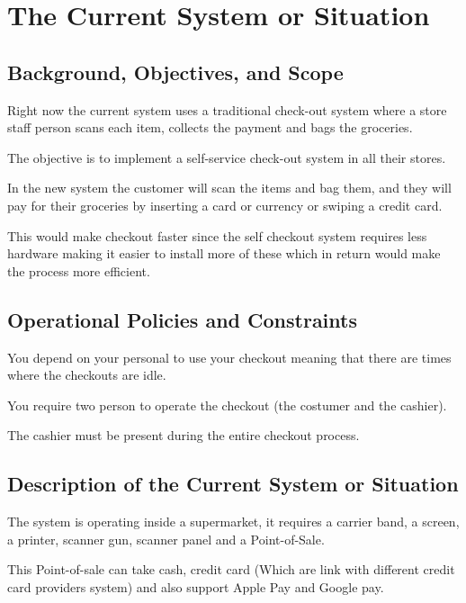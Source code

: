 \section{The Current System or Situation}

\subsection{Background, Objectives, and Scope}

Right now the current system uses a traditional check-out system where a store 
staff person scans each item, collects the payment 
and bags the groceries. \newline

The objective is to implement a self-service check-out system in all 
their stores.\newline

In the new system the customer will scan the items and bag them, and they will 
pay for their groceries by inserting a card or currency 
or swiping a credit card. \newline

This would make checkout faster since the self checkout system requires less 
hardware making it easier to install more of these which in return would make 
the process more efficient.

\subsection{Operational Policies and Constraints}
You depend on your personal to use your checkout meaning that there are 
times where the checkouts are idle. \newline

You require two person to operate the checkout (the costumer 
and the cashier). \newline

The cashier must be present during the entire checkout process.

\pagebreak

\subsection{Description of the Current System or Situation}
The system is operating inside a supermarket, it requires a carrier band, a 
screen, a printer, scanner gun, scanner panel and a Point-of-Sale.\newline

This Point-of-sale can take cash, credit card (Which are link with different 
credit card providers system) and also support 
Apple Pay and Google pay.\newline

